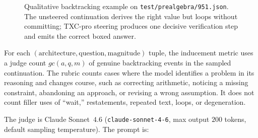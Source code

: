 \begin{figure}[t]
    \centering
    \scriptsize
    \setlength{\fboxsep}{2pt}

    \begin{minipage}[t]{0.49\linewidth}
    \end{minipage}\hfill
    \begin{minipage}[t]{0.49\linewidth}
    \end{minipage}

    \caption{Qualitative backtracking example on \texttt{test/prealgebra/951.json}. The unsteered continuation derives the right value but loops without committing; TXC-pro steering produces one decisive verification step and emits the correct boxed answer.}
    \label{fig:c7-headline-text-app}
\end{figure}

For each $(\text{architecture}, \text{question}, \text{magnitude})$ tuple, the inducement metric uses a judge count $gc(a,q,m)$ of genuine backtracking events in the sampled continuation. The rubric counts cases where the model identifies a problem in its reasoning and changes course, such as correcting arithmetic, noticing a missing constraint, abandoning an approach, or revising a wrong assumption. It does not count filler uses of ``wait,'' restatements, repeated text, loops, or degeneration.

The judge is Claude Sonnet~$4.6$ (\texttt{claude-sonnet-4-6}, max output $200$ tokens, default sampling temperature). The prompt is:

